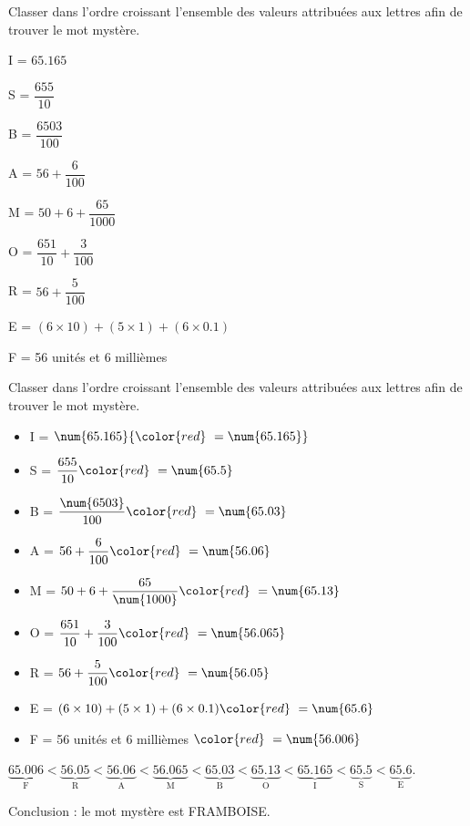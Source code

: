 \begin{exercice} %
    Classer dans l'ordre croissant l'ensemble des valeurs attribuées aux lettres afin de trouver le mot mystère.
        \begin{itemize}
            \begin{spacing}{2}
            \item I = $\num{65.165}$
            \item S = $\dfrac{655}{10}$
            \item B = $\dfrac{\num{6503}}{100}$
            \item A = $56+\dfrac{6}{100}$
            \item M = $50+6+\dfrac{65}{\num{1000}}$
            \item O = $\dfrac{651}{10}+\dfrac{3}{100}$
            \item R = $56+\dfrac{5}{100}$
            \item E = $(6\times10)+(5\times1)+(6\times0.1)$
            \item F = 56 unités et 6 millièmes
        \end{spacing}
        \end{itemize}    
\end{exercice}
\begin{corrige}
    Classer dans l'ordre croissant l'ensemble des valeurs attribuées aux lettres afin de trouver le mot mystère.
    \begin{spacing}{2}
        \begin{itemize}
            \item I = $\num{65.165}                  {\color{red} ~= \num{65.165}}$
            \item S = $\dfrac{655}{10}               {\color{red} ~= \num{65.5}  }$
            \item B = $\dfrac{\num{6503}}{100}       {\color{red} ~= \num{65.03} }$
            \item A = $56+\dfrac{6}{100}             {\color{red} ~= \num{56.06} }$
            \item M = $50+6+\dfrac{65}{\num{1000}}   {\color{red} ~= \num{65.13} }$
            \item O = $\dfrac{651}{10}+\dfrac{3}{100}{\color{red} ~= \num{56.065}}$
            \item R = $56+\dfrac{5}{100}             {\color{red} ~= \num{56.05} }$
            \item E = $(6\times10)+(5\times1)+(6\times0.1) {\color{red} ~= \num{65.6}  }$
            \item F = 56 unités et 6 millièmes ${\color{red} ~=            \num{56.006}}$
        \end{itemize}  
    \end{spacing}

    \medskip
    {\scriptsize $\underbrace{\num{65.006}}_\text{F} < \underbrace{\num{56.05}}_\text{R} < \underbrace{\num{56.06}}_\text{A} < \underbrace{\num{56.065}}_\text{M} < \underbrace{\num{65.03}}_\text{B} < \underbrace{\num{65.13}}_\text{O} < \underbrace{\num{65.165}}_\text{I} < \underbrace{\num{65.5}}_\text{S} < \underbrace{\num{65.6}}_\text{E}$}.

    \medskip
    Conclusion : le mot mystère est \red FRAMBOISE.
 \end{corrige}